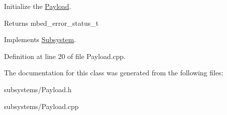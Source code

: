 Initialize the \mbox{\hyperlink{class_payload}{Payload}}. 

\begin{DoxyReturn}{Returns}
mbed\+\_\+error\+\_\+status\+\_\+t 
\end{DoxyReturn}


Implements \mbox{\hyperlink{class_subsystem_afa43e7c1c8b49e514b944f517d4dc905}{Subsystem}}.



Definition at line 20 of file Payload.\+cpp.



The documentation for this class was generated from the following files\+:\begin{DoxyCompactItemize}
\item 
subsystems/Payload.\+h\item 
subsystems/Payload.\+cpp\end{DoxyCompactItemize}
